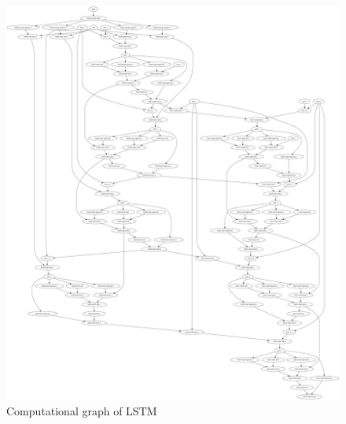 \begin{figure}[th]
\centering
\includegraphics[scale=0.1]{Figures/lstm_dataflow.png}
\decoRule
\caption[lstm]{Computational graph of LSTM}
\label{fig:comp_graph_lstm}
\end{figure}

